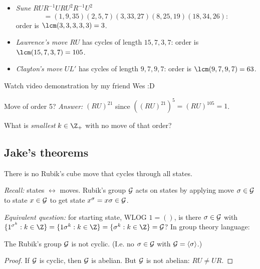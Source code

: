 \begin{slide}
    \begin{itemize}
        \item \textit{Sune} $RUR^{-1}URU^2R^{-1}U^2$
              $$= (1,9,35)(2,5,7)(3,33,27)(8,25,19)(18,34,26){:}$$
              order is $\lcm(3,3,3,3,3) = 3$. \pause
        \item \textit{Lawrence's move} $RU$ has cycles of length $15,7,3,7$: order is $\lcm(15,7,3,7) = 105$. \pause
        \item \textit{Clayton's move} $UL'$ has cycles of length $9,7,9,7$: order is $\lcm(9,7,9,7) = 63$.
    \end{itemize}

    Watch video demonstration by my friend Wes :D \pause

    Move of order 5? \pause \textit{Answer:} $(RU)^{21}$ since $((RU)^{21})^5 = (RU)^{105} = 1$.

    What is \textit{smallest} $k \in \Z_+$ with no move of that order?
\end{slide}

\subsection{Jake's theorems}

\begin{slide}
    \begin{theorem}
        \vspace{0pt}
        There is no Rubik's cube move that cycles through all states.
    \end{theorem} \pause

    \textit{Recall:} states $\leftrightarrow$ moves. Rubik's group $\mathcal{G}$ acts on states by applying move $\sigma \in \mathcal{G}$ to state $x \in \mathcal{G}$ to get state $x^\sigma = x\sigma \in \mathcal{G}$. \pause

    \textit{Equivalent question:} for starting state, WLOG $1 = ()$, is there $\sigma \in \mathcal{G}$ with $\{1^{\sigma^k} : k \in \Z\} = \{1\sigma^k : k \in \Z\} = \{\sigma^k : k \in \Z\} = \RC$? \pause In group theory language:

    \begin{theorem}
        \vspace{0pt}
        The Rubik's group $\mathcal{G}$ is not cyclic. (I.e. no $\sigma \in \mathcal{G}$ with $\mathcal{G} = \langle \sigma \rangle$.)
    \end{theorem} \pause

    \begin{proof}
        \vspace{0pt}
        If $\mathcal{G}$ is cyclic, then $\mathcal{G}$ is abelian. \pause But $\mathcal{G}$ is not abelian: $RU \neq UR$.
    \end{proof}
\end{slide}


